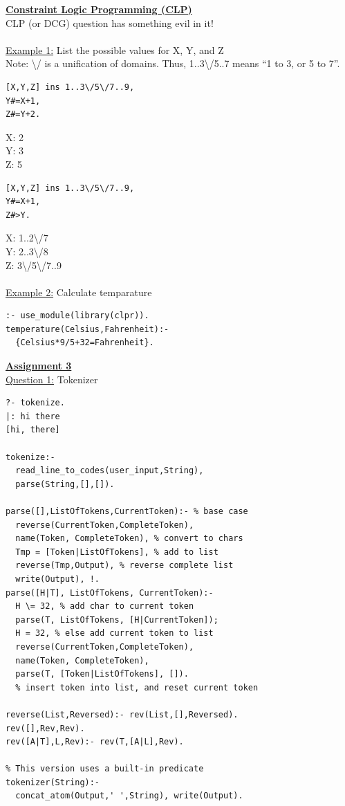 \documentclass[8pt,letterpaper,twocolumn]{article}
\begin{document}
\underline{\textbf{Constraint Logic Programming (CLP)}}\\
CLP (or DCG) question has something evil in it!\\
\\
\underline{Example 1:} List the possible values for X, Y, and Z\\
Note: \textbackslash/ is a unification of domains. Thus, 1..3\textbackslash/5..7 means ``1 to 3, or 5 to 7''.
\begin{verbatim}
[X,Y,Z] ins 1..3\/5\/7..9,
Y#=X+1,
Z#=Y+2.
\end{verbatim}
X: 2\\
Y: 3\\
Z: 5
\begin{verbatim}
[X,Y,Z] ins 1..3\/5\/7..9,
Y#=X+1,
Z#>Y.
\end{verbatim}
X: 1..2\textbackslash/7 \\
Y: 2..3\textbackslash/8 \\
Z: 3\textbackslash/5\textbackslash/7..9 \\
\\
\underline{Example 2:} Calculate temparature
\begin{verbatim}
:- use_module(library(clpr)).
temperature(Celsius,Fahrenheit):-
  {Celsius*9/5+32=Fahrenheit}.
\end{verbatim}
\underline{\textbf{Assignment 3}}\\
\underline{Question 1:} Tokenizer
\begin{verbatim}
?- tokenize.
|: hi there
[hi, there]

tokenize:-
  read_line_to_codes(user_input,String),
  parse(String,[],[]).

parse([],ListOfTokens,CurrentToken):- % base case
  reverse(CurrentToken,CompleteToken),
  name(Token, CompleteToken), % convert to chars
  Tmp = [Token|ListOfTokens], % add to list
  reverse(Tmp,Output), % reverse complete list
  write(Output), !.
parse([H|T], ListOfTokens, CurrentToken):-
  H \= 32, % add char to current token
  parse(T, ListOfTokens, [H|CurrentToken]);
  H = 32, % else add current token to list
  reverse(CurrentToken,CompleteToken),
  name(Token, CompleteToken),
  parse(T, [Token|ListOfTokens], []).
  % insert token into list, and reset current token

reverse(List,Reversed):- rev(List,[],Reversed).
rev([],Rev,Rev).
rev([A|T],L,Rev):- rev(T,[A|L],Rev).

% This version uses a built-in predicate
tokenizer(String):-
  concat_atom(Output,' ',String), write(Output).
\end{verbatim}
\end{document}
